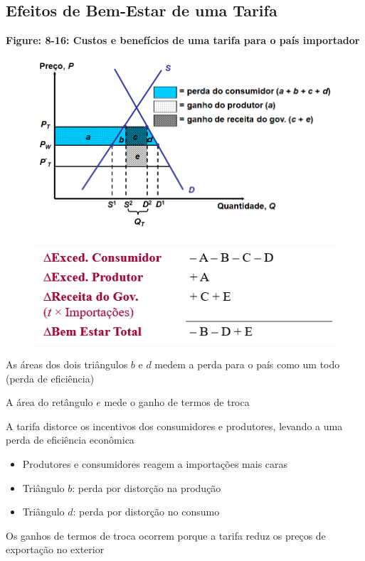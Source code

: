 \documentclass[a4paper,12pt]{article}[abntex2]
\begin{document}
\subsection{\textbf{Efeitos de Bem-Estar de uma Tarifa}}


\textbf{Figure: 8-16: Custos e benefícios de uma tarifa para o país importador}
\begin{figure}[H]
    \centering
    \includegraphics[width=0.7\linewidth]{Imagens/a21i4.png}
\end{figure}

\begin{figure}[H]
    \centering
    \includegraphics[width=0.7\linewidth]{Imagens/a21i5.png}
\end{figure}

As áreas dos dois triângulos \( b \) e \( d \) medem a perda para o país como um todo (perda de eficiência)

A área do retângulo \( e \) mede o ganho de termos de troca

A tarifa distorce os incentivos dos consumidores e produtores, levando a uma perda de eficiência econômica
\begin{itemize}
  \item Produtores e consumidores reagem a importações mais caras
  \item Triângulo \( b \): perda por distorção na produção
  \item Triângulo \( d \): perda por distorção no consumo
\end{itemize}

Os ganhos de termos de troca ocorrem porque a tarifa reduz os preços de exportação no exterior
\end{document}
